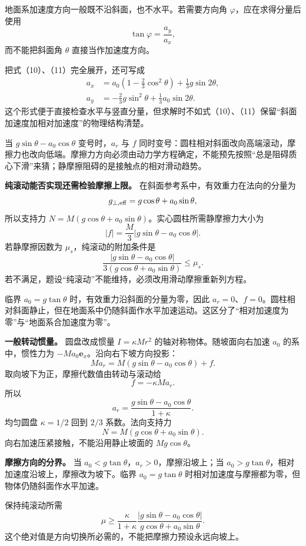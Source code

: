 \documentclass[12pt,a4paper,UTF8]{ctexart}
\begin{document}
地面系加速度方向一般既不沿斜面，也不水平。若需要方向角
\(\varphi\)，应在求得分量后使用 \[
\tan\varphi=\frac{a_y}{a_x}, \tag{21}
\] 而不能把斜面角 \(\theta\) 直接当作加速度方向。

把式（10）、（11）完全展开，还可写成 \[
\begin{aligned}
a_x
&=a_0\left(1-\frac23\cos^2\theta\right)
+\frac13g\sin2\theta,\\
a_y
&=-\frac23g\sin^2\theta
+\frac13a_0\sin2\theta.
\end{aligned} \tag{22}
\]
这个形式便于直接检查水平与竖直分量，但求解时不如式（10）、（11）保留``斜面加速度加相对加速度''的物理结构清楚。

当 \(g\sin\theta-a_0\cos\theta\) 变号时，\(a_r\) 与 \(f\)
同时变号：圆柱相对斜面改向高端滚动，摩擦力也改向低端。摩擦力方向必须由动力学方程确定，不能预先按照``总是阻碍质心下滑''来猜；静摩擦阻碍的是接触点的相对滑动趋势。

\textbf{纯滚动能否实现还需检验摩擦上限。}
在斜面参考系中，有效重力在法向的分量为 \[
g_{\perp,\rm eff}=g\cos\theta+a_0\sin\theta,
\] 所以支持力
\(N=M(g\cos\theta+a_0\sin\theta)\)。实心圆柱所需静摩擦力大小为 \[
|f|=\frac M3
|g\sin\theta-a_0\cos\theta|.
\] 若静摩擦因数为 \(\mu_s\)，纯滚动的附加条件是 \[
\boxed{
\frac{|g\sin\theta-a_0\cos\theta|}
{3(g\cos\theta+a_0\sin\theta)}
\le\mu_s
}.
\] 若不满足，题设``纯滚动''不能维持，必须改用滑动摩擦重新列方程。

临界 \(a_0=g\tan\theta\) 时，有效重力沿斜面的分量为零，因此
\(a_r=0\)、\(f=0\)。圆柱相对斜面静止，但在地面系中仍随斜面作水平加速运动。这区分了``相对加速度为零''与``地面系合加速度为零''。

\textbf{一般转动惯量。} 圆盘改成惯量 \(I=\kappa Mr^2\)
的轴对称物体。随坡面向右加速 \(a_0\) 的系中，惯性力为
\(-Ma_0\boldsymbol e_x\)。沿向右下坡方向投影： \[
Ma_r=M(g\sin\theta-a_0\cos\theta)+f.
\] 取向坡下为正，摩擦代数值由转动与滚动给 \[
f=-\kappa Ma_r.
\] 所以 \[
\boxed{a_r=\frac{g\sin\theta-a_0\cos\theta}{1+\kappa}}.
\] 均匀圆盘 \(\kappa=1/2\) 回到 \(2/3\) 系数。法向支持力 \[
N=M(g\cos\theta+a_0\sin\theta).
\] 向右加速压紧接触，不能沿用静止坡面的 \(Mg\cos\theta\)。

\textbf{摩擦方向的分界。} 当
\(a_0<g\tan\theta\)，\(a_r>0\)，摩擦沿坡上；当
\(a_0>g\tan\theta\)，相对加速度沿坡上，摩擦改为坡下。临界
\(a_0=g\tan\theta\) 时相对加速度与摩擦都为零，但物体仍随斜面作水平加速。

保持纯滚动所需 \[
\boxed{\mu\ge
\frac{\kappa}{1+\kappa}
\frac{|g\sin\theta-a_0\cos\theta|}
{g\cos\theta+a_0\sin\theta}}.
\] 这个绝对值是方向切换所必需的，不能把摩擦力预设永远向坡上。
\end{document}
